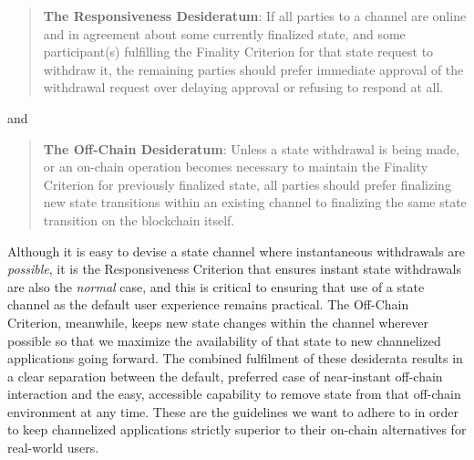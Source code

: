 \documentclass[prb,floatfix,reprint,nofootinbib,amsmath,amssymb,epsfig,pre,floats,letterpaper,groupedaffiliation,tightenlines,allcolors=blue,11pt]{revtex4}
\theoremstyle{definition}
\theoremstyle{definition}
\theoremstyle{definition}
\begin{document}
\begin{quote}
\textbf{The Responsiveness Desideratum}: If all parties to a channel are online and in agreement about some currently finalized state, and some participant(s) fulfilling the Finality Criterion for that state request to withdraw it, the remaining parties should prefer immediate approval of the withdrawal request over delaying approval or refusing to respond at all.
\end{quote}

and

\begin{quote}
\textbf{The Off-Chain Desideratum}: Unless a state withdrawal is being made, or an on-chain operation becomes necessary to maintain the Finality Criterion for previously finalized state, all parties should prefer finalizing new state transitions within an existing channel to finalizing the same state transition on the blockchain itself.
\end{quote}


Although it is easy to devise a state channel where instantaneous withdrawals are \textit{possible}, it is the Responsiveness Criterion that ensures instant state withdrawals are also the \textit{normal} case, and this is critical to ensuring that use of a state channel as the default user experience remains practical.  The Off-Chain Criterion, meanwhile, keeps new state changes within the channel wherever possible so that we maximize the availability of that state to new channelized applications going forward.  The combined fulfilment of these desiderata results in a clear separation between the default, preferred case of near-instant off-chain interaction and the easy, accessible capability to remove state from that off-chain environment at any time.  These are the guidelines we want to adhere to in order to keep channelized applications strictly superior to their on-chain alternatives for real-world users.

\end{document}
